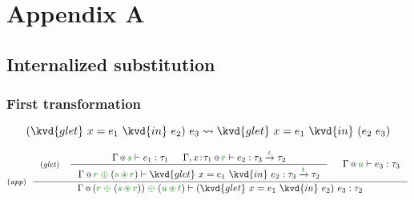 
\chapter{Appendix A} 
\label{ch:appendix} 


%
%
%  
%
%


%
%  
%
%



\section{Internalized substitution}

\subsection{First transformation}

\begin{equation*}
(\kvd{glet}~x=e_1~\kvd{in}~e_2)~e_3 \leadsto \kvd{glet}~x=e_1~\kvd{in}~(e_2~e_3)
\end{equation*}

\begin{equation*}
\tyrule{app}
  { \tyrule{glet}
      { \coctx{\Gamma}{\cclrd{s}} \vdash e_1 : \tau_1 &
        \coctx{\Gamma, x\!:\!\tau_1}{\cclrd{r}} \vdash e_2 : \tau_3 \xrightarrow{\cclrd{t}} \tau_2 }
      { \coctx{\Gamma}{\cclrd{r}\;\cpar\;({\cclrd{s}\,\cseq\,\cclrd{r})}} \vdash \kvd{glet}~x=e_1~\kvd{in}~e_2 : \tau_3 \xrightarrow{\cclrd{t}} \tau_2 } &
    \coctx{\Gamma}{\cclrd{u}} \vdash e_3 : \tau_3  }
  { \coctx{\Gamma}{(\cclrd{r}\;\cpar\;(\cclrd{s}\,\cseq\,\cclrd{r})) \;\cpar\; (\cclrd{u}\,\cseq\,\cclrd{t}) } \vdash (\kvd{glet}~x=e_1~\kvd{in}~e_2)~e_3 : \tau_2 }
\end{equation*}

